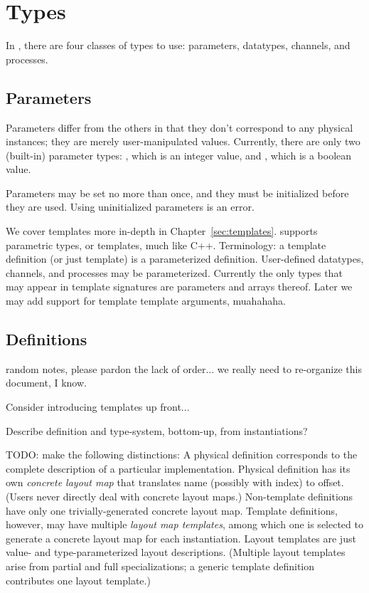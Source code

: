 

\chapter{Types}
\label{sec:types}

In \artxx, there are four classes of types to use:
parameters, datatypes, channels, and processes.  

\section{Parameters}
\label{sec:parameters}

Parameters differ from the others in that they don't correspond
to any physical instances; they are merely user-manipulated values.  
Currently, there are only two (built-in) parameter types: 
\pint, which is an integer value,
and \pbool, which is a boolean value.  

Parameters may be set no more than once, and they must be 
initialized before they are used.  
Using uninitialized parameters is an error.  


We cover templates more in-depth in Chapter~\ref{sec:templates}.  
\artxx supports parametric types, or templates, much like C++. 
Terminology: a template definition (or just template)
is a parameterized definition.  
User-defined datatypes, channels, and processes may be parameterized.  
Currently the only types that may appear in template signatures
are parameters and arrays thereof.  
Later we may add support for template template arguments, muahahaha.  

\section{Definitions}
\label{sec:types:definition}

random notes, please pardon the lack of order...
we really need to re-organize this document, I know.

Consider introducing templates up front...

Describe definition and type-system, bottom-up, from instantiations?

TODO: make the following distinctions:
A physical definition corresponds to the complete description of
a particular implementation.  
Physical definition has its own 
\emph{concrete layout map} 
that translates name (possibly with index) to offset.  
(Users never directly deal with concrete layout maps.)  
Non-template definitions have only one trivially-generated 
concrete layout map.  
Template definitions, however, may have multiple \emph{layout map templates}, 
among which one is selected to generate a concrete layout map for
each instantiation.  
Layout templates are just value- and type-parameterized layout descriptions.  
(Multiple layout templates arise from partial and full specializations; 
a generic template definition contributes one layout template.)


